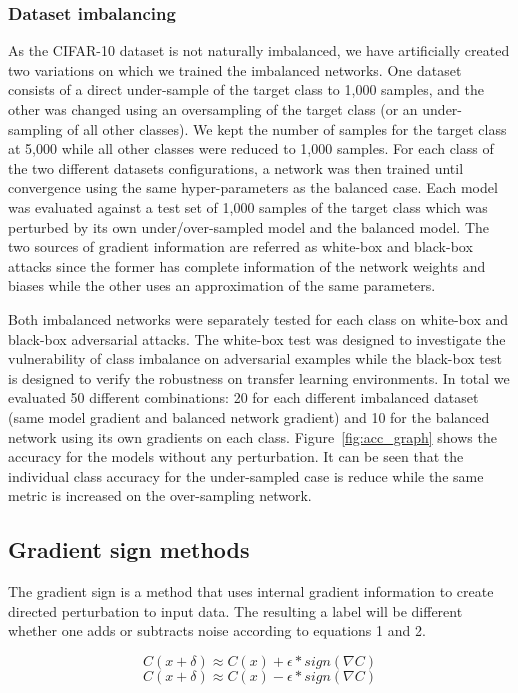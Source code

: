 \documentclass[runningheads,a4paper]{llncs}
\begin{document}
\subsubsection{Dataset imbalancing} As the CIFAR-10 dataset is not naturally imbalanced, we have artificially created two variations on which we trained the imbalanced networks.  One dataset consists of a direct under-sample of the target class to 1,000 samples, and the other was changed using  an oversampling of the target class (or an under-sampling of all other classes). We kept the number of samples for the target class at 5,000 while all other classes were reduced to 1,000 samples. For each class of the two different datasets configurations, a network was then trained until convergence using the same hyper-parameters as the balanced case. Each model was evaluated against a test set of 1,000 samples of the target class which was  perturbed by its own under/over-sampled model and the balanced model. The two sources of gradient information are referred as white-box and black-box attacks since the former has complete information of the network weights and biases while the other uses an approximation of the same parameters. 

Both imbalanced networks were separately tested for each class on white-box and black-box adversarial attacks. The white-box test was designed to investigate the vulnerability of class imbalance on adversarial examples while the black-box test is designed to verify the robustness on transfer learning environments. In total we evaluated 50 different combinations: 20 for each different imbalanced dataset (same model gradient and balanced network gradient) and 10 for the balanced network using its own gradients on each class. Figure~\ref{fig:acc_graph} shows the accuracy for the models without any perturbation. It can be seen that the individual class accuracy for the under-sampled case is reduce while the same metric is increased on the over-sampling network. 


\subsection{Gradient sign methods}

The gradient sign is a method that uses internal gradient information to create directed perturbation to input data. The resulting a label will be different whether one adds or subtracts noise according to equations 1 and 2. 

\begin{equation}
C(x + \delta)\approx C(x) + \epsilon * sign(\nabla C)
\end{equation}
\begin{equation}
C(x + \delta)\approx C(x) - \epsilon * sign(\nabla C)
\end{equation}
\end{document}
